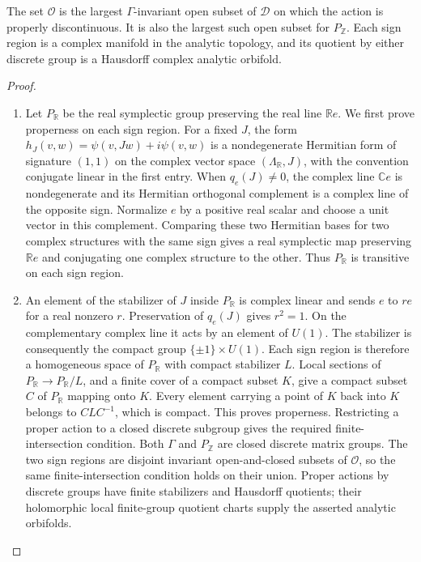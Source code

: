 \begin{theorem}\hypertarget{tag-01RC}{}\label{fam:src:F.2.2}\label{fam:st:F.2.2}

The set $\mathcal O$ is the largest $\Gamma$-invariant open subset of
$\mathcal D$ on which the action is properly discontinuous.  It is also
the largest such open subset for $P_{\mathbb Z}$.  Each sign region is
a complex manifold in the analytic topology, and its quotient by either
discrete group is a Hausdorff complex analytic orbifold.
\end{theorem}



\begin{proof}
\begin{enumerate}[label=\arabic*.,leftmargin=*]
\item Let $P_{\mathbb R}$ be the real symplectic group preserving the real line
$\mathbb Re$.  We first prove properness on each sign region.  For a fixed
$J$, the form
$h_J(v,w)=\psi(v,Jw)+i\psi(v,w)$ is a nondegenerate Hermitian form of
signature $(1,1)$ on the complex vector space $(\Lambda_{\mathbb R},J)$,
with the convention conjugate linear in the first entry.  When
$q_e(J)\ne0$, the complex line $\mathbb Ce$ is nondegenerate and its
Hermitian orthogonal complement is a complex line of the opposite sign.
Normalize $e$ by a positive real scalar and choose a unit vector in this
complement.  Comparing these two Hermitian bases for two complex
structures with the same sign gives a real symplectic map preserving
$\mathbb Re$ and conjugating one complex structure to the other.  Thus
$P_{\mathbb R}$ is transitive on each sign region.

\item An element of the stabilizer of $J$ inside $P_{\mathbb R}$ is complex
linear and sends $e$ to $r e$ for a real nonzero $r$.  Preservation of
$q_e(J)$ gives $r^2=1$.  On the complementary complex line it acts by an
element of $U(1)$.  The stabilizer is consequently the compact group
$\{\pm1\}\times U(1)$.  Each sign region is therefore a homogeneous
space of $P_{\mathbb R}$ with compact stabilizer $L$.  Local sections of
$P_{\mathbb R}\to P_{\mathbb R}/L$, and a finite cover of a compact
subset $K$, give a compact subset $C$ of $P_{\mathbb R}$ mapping onto
$K$.  Every element carrying a point of $K$ back into $K$ belongs to
$CLC^{-1}$, which is compact.  This proves properness.  Restricting a
proper action to a closed discrete subgroup gives
the required finite-intersection condition.  Both $\Gamma$ and
$P_{\mathbb Z}$ are closed discrete matrix groups.  The two sign regions
are disjoint invariant open-and-closed subsets of $\mathcal O$, so the
same finite-intersection condition holds on their union.  Proper actions
by discrete groups have finite stabilizers and Hausdorff quotients; their
holomorphic local finite-group quotient charts supply the asserted
analytic orbifolds.


\end{enumerate}
\end{proof}
